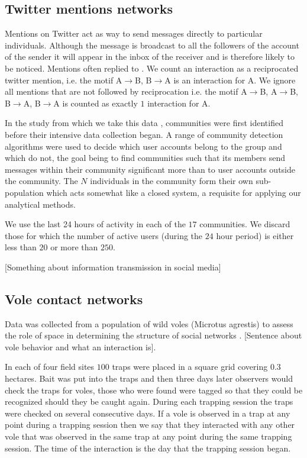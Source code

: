 \documentclass[10pt]{article}
\begin{document}
\begin{multicols}{2}
\subsection{Twitter mentions networks}
Mentions on Twitter act as way to send messages directly to particular individuals. Although the message is broadcast to all the followers of the  account of the sender it will appear in the inbox of the receiver and is therefore likely to be noticed. Mentions often replied to \cite{10.1371/journal.pone.0022656}. We count an interaction as a reciprocated twitter mention, i.e. the motif A$\rightarrow$B, B$\rightarrow$A is an  interaction for A. We ignore all mentions that are not followed by reciprocation i.e. the motif A$\rightarrow$B, A$\rightarrow$B, B$\rightarrow$A, B$\rightarrow$A is counted as exactly $1$ interaction for A.

In the study from which we take this data \cite{Charlton160162}, communities were first identified before their intensive data collection began. A range of community detection algorithms were used to decide which user accounts belong to the group and which do not, the goal being to find communities such that its members send messages within their community significant more than to user accounts outside the community. The $N$ individuals in the community form their own sub-population which acts somewhat like a closed system, a requisite for applying our analytical methods. 

We use the last 24 hours of activity in each of the $17$ communities. We discard those for which the number of active users (during the $24$ hour period) is either less than $20$ or more than $250$.

[Something about information transmission in social media]
\subsection{Vole contact networks} 
Data was collected from a population of wild voles (Microtus agrestis) to assess the role of space in determining the structure of social networks \cite{Davis20141004}. [Sentence about vole behavior and what an interaction is].

In each of four field sites $100$ traps were placed in a square grid covering $0.3$ hectares. Bait was put into the traps and then three days later observers would check the traps for voles, those who were found were tagged so that they could be recognized should they be caught again. During each trapping session the traps were checked on several consecutive days. If a vole is observed in a trap at any point during a trapping session then we say that they interacted with any other vole that was observed in the same trap at any point during the same trapping session. The time of the interaction is the day that the trapping session began. 


\end{multicols}
\end{document}
